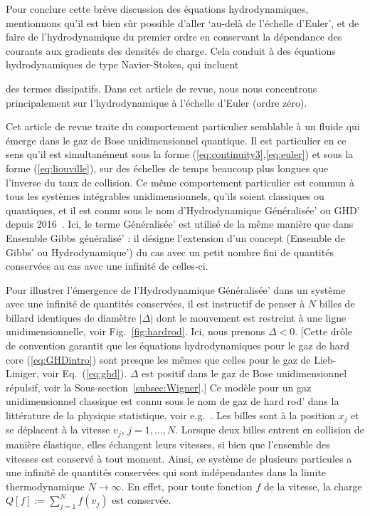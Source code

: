 Pour conclure cette brève discussion des équations hydrodynamiques, mentionnons qu'il est bien sûr possible d'aller `au-delà de l'échelle d'Euler', et de faire de l'hydrodynamique du premier ordre en conservant la dépendance des courants aux gradients des densités de charge. Cela conduit à des équations hydrodynamiques de type Navier-Stokes, qui incluent

 des termes dissipatifs. Dans cet article de revue, nous nous concentrons principalement sur l'hydrodynamique à l'échelle d'Euler (ordre zéro).
 
 \vspace{0.5cm}

Cet article de revue traite du comportement particulier semblable à un fluide qui émerge dans le gaz de Bose unidimensionnel quantique. Il est particulier en ce sens qu'il est simultanément sous la forme (\ref{eq:continuity3},\ref{eq:euler}) et sous la forme (\ref{eq:liouville}), sur des échelles de temps beaucoup plus longues que l'inverse du taux de collision. Ce même comportement particulier est commun à tous les systèmes intégrables unidimensionnels, qu'ils soient classiques ou quantiques, et il est connu sous le nom d'Hydrodynamique Généralisée' ou GHD' depuis 2016~\citep{castro2016emergent,bertini2016transport}. Ici, le terme Généralisée' est utilisé de la même manière que dans Ensemble Gibbs généralisé' \citep{rigol2007relaxation,rigol2008thermalization} : il désigne l'extension d'un concept (Ensemble de Gibbs' ou Hydrodynamique') du cas avec un petit nombre fini de quantités conservées au cas avec une infinité de celles-ci.

\vspace{0.5cm}

Pour illustrer l'émergence de l'Hydrodynamique Généralisée' dans un système avec une infinité de quantités conservées, il est instructif de penser à \(N\) billes de billard identiques de diamètre \(|\Delta|\) dont le mouvement est restreint à une ligne unidimensionnelle, voir Fig.~\ref{fig:hardrod}. Ici, nous prenons \(\Delta < 0\). [Cette drôle de convention garantit que les équations hydrodynamiques pour le gaz de hard core (\ref{eq:GHDintro}) sont presque les mêmes que celles pour le gaz de Lieb-Liniger, voir Eq.~(\ref{eq:ghd}). \(\Delta\) est positif dans le gaz de Bose unidimensionnel répulsif, voir la Sous-section~\ref{subsec:Wigner}.] Ce modèle pour un gaz unidimensionnel classique est connu sous le nom de gaz de hard rod' dans la littérature de la physique statistique, voir e.g.~\citep{percus1976equilibrium,lebowitz1967kinetic,aizenman1975ergodic,boldrighini1983one,spohn2012large,boldrighini1997one,doyon2017dynamics,cao2018incomplete}. Les billes sont à la position \(x_j\) et se déplacent à la vitesse \(v_j\), \(j=1,\dots , N\). Lorsque deux billes entrent en collision de manière élastique, elles échangent leurs vitesses, si bien que l'ensemble des vitesses est conservé à tout moment. Ainsi, ce système de plusieurs particules a une infinité de quantités conservées qui sont indépendantes dans la limite thermodynamique \(N\rightarrow \infty\). En effet, pour toute fonction \(f\) de la vitesse, la charge \(Q[f] := \sum_{j=1}^N f(v_j)\) est conservée.

